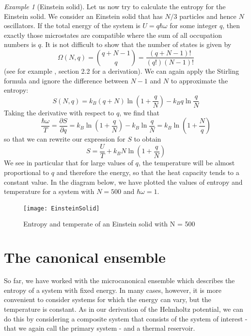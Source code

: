 \documentclass[a4paper, draft]{report}
\numberwithin{section}{chapter}
\numberwithin{equation}{chapter}
\theoremstyle{own}
\theoremstyle{remark}
\newtheorem{example}{Example}[section]
\begin{document}
\begin{example}[Einstein solid]
Let us now try to calculate the entropy for the Einstein solid. We consider an Einstein solid that has $N/3$ particles and hence $N$ oscillators. If the total energy of the system is $U = q\hbar \omega$ for some integer $q$, then exactly those microstates are compatible where the sum of all occupation numbers is $q$. It is not difficult to show that the number of states is given by
$$
\Omega(N,q) = {\binom{q + N -1}{q}} = \frac{(q+N-1)!}{(q!)(N-1)!}
$$
(see for example \cite{Schroeder}, section 2.2 for a derivation). We can again apply the Stirling formula  and ignore the difference between $N-1$ and $N$ to approximate the entropy:
$$
S(N,q) = k_B (q+N) \ln (1 + \frac{q}{N}) - k_B q \ln \frac{q}{N}
$$
Taking the derivative with respect to $q$, we find that
$$
\frac{\hbar \omega}{T} = \frac{\partial S}{\partial q} = k_B \ln (1 + \frac{q}{N}) - k_B \ln \frac{q}{N} 
= k_B \ln (1 + \frac{N}{q})
$$
so that we can rewrite our expression for $S$ to obtain
$$
S = \frac{U}{T} + k_B N \ln (1 + \frac{q}{N})
$$
We see in particular that for large values of $q$, the temperature will be almost proportional to $q$ and therefore the energy, so that the heat capacity tends to a constant value. In the diagram below, we have plotted the values of entropy and temperature for a system with $N = 500$ and $\hbar \omega = 1$. 

\begin{figure}[ht]
\centering
\texttt{[image: EinsteinSolid]}
\caption{Entropy and temperate of an Einstein solid with N = 500}
\label{fig:EinsteinSolid}
\end{figure}

\end{example}



\section{The canonical ensemble}
\label{sec:canonicalditribution} 

So far, we have worked with the microcanonical ensemble which describes the entropy of a system with fixed energy. In many cases, however, it is more convenient to consider systems for which the energy can vary, but the temperature is constant. As in our derivation of the Helmholtz potential, we can do this by considering a composite system that consists of the system of interest - that we again call the primary system - and a thermal reservoir.
\end{document}
